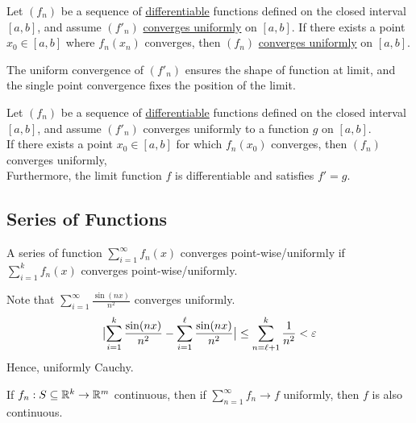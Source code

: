 \documentclass[11pt]{article}
\begin{document}
	\begin{theorem}
		Let $(f_n)$ be a sequence of \ul{differentiable} functions defined on the closed interval $[a, b]$, and assume $(f'_n)$ \ul{converges uniformly} on $[a, b]$. If there exists a point $x_0 \in [a, b]$ where $f_n(x_n)$ converges, then $(f_n)$ \ul{converges uniformly} on $[a, b]$.
	\end{theorem}
	
	\begin{remark}
		The uniform convergence of $(f'_n)$ ensures the shape of function at limit, and the single point convergence fixes the position of the limit.
	\end{remark}
	
	\begin{theorem}
		Let $(f_n)$ be a sequence of \ul{differentiable} functions defined on the closed interval $[a, b]$, and assume $(f'_n)$ converges uniformly to a function $g$ on $[a, b]$. \\
		If there exists a point $x_0 \in [a, b]$ for which $f_n(x_0)$ converges, then $(f_n)$ converges uniformly, \\
		Furthermore, the limit function $f$ is differentiable and satisfies $f' = g$.
	\end{theorem}
	
	\subsection{Series of Functions}
	\begin{definition}
		A series of function $\sum_{i=1}^\infty f_n(x)$ converges point-wise/uniformly if $\sum_{i=1}^k f_n(x)$ converges point-wise/uniformly.
 	\end{definition}
 	
 	\begin{example}
 		Note that $\sum_{i=1}^\infty \frac{\sin(nx)}{n^2}$ converges uniformly.
 		\begin{align}
 			\big \vert {\sum_{i=1}^k \frac{\sin(nx)}{n^2} - \sum_{i=1}^\ell \frac{\sin(nx)}{n^2}} \big \vert \leq \sum_{n=\ell+1}^k \frac{1}{n^2} < \varepsilon
 		\end{align}
 		Hence, uniformly Cauchy.
 	\end{example}
 	
 	\begin{theorem}
 		If $f_n: S \subseteq \mathbb{R}^k \to \mathbb{R}^m$ continuous, then if $\sum_{n=1}^\infty f_n \to f$ uniformly, then $f$ is also continuous.
 	\end{theorem}
 	
\end{document}
